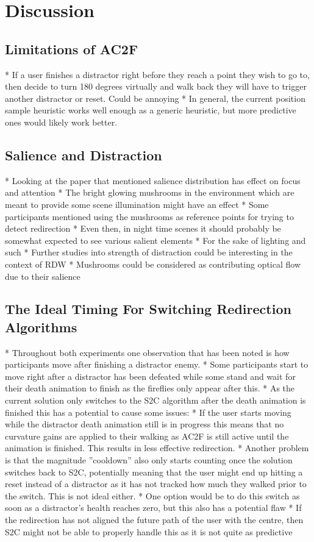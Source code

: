 \chapter{Discussion}
\label{chap:discussion}

\section{Limitations of AC2F}
* If a user finishes a distractor right before they reach a point they wish to go to, then decide to turn 180 degrees virtually and walk back they will have to trigger another distractor or reset. Could be annoying
   * In general, the current position sample heuristic works well enough as a generic heuristic, but more predictive ones would likely work better. 
   
\section{Salience and Distraction}
* Looking at the paper that mentioned salience distribution has effect on focus and attention
   * The bright glowing mushrooms in the environment which are meant to provide some scene illumination might have an effect 
   * Some participants mentioned using the mushrooms as reference points for trying to detect redirection
   * Even then, in night time scenes it should probably be somewhat expected to see various salient elements
      * For the sake of lighting and such
   * Further studies into strength of distraction could be interesting in the context of RDW
   * Mushrooms could be considered as contributing optical flow due to their salience

\section{The Ideal Timing For Switching Redirection Algorithms}
* Throughout both experiments one observation that has been noted is how participants move after finishing a distractor enemy.
* Some participants start to move right after a distractor has been defeated while some stand and wait for their death animation to finish as the fireflies only appear after this. 
* As the current solution only switches to the S2C algorithm after the death animation is finished this has a potential to cause some issues:
   * If the user starts moving while the distractor death animation still is in progress this means that no curvature gains are applied to their walking as AC2F is still active until the animation is finished. This results in less effective redirection.
   * Another problem is that the magnitude ''cooldown'' also only starts counting once the solution switches back to S2C, potentially meaning that the user might end up hitting a reset instead of a distractor as it has not tracked how much they walked prior to the switch. This is not ideal either.
* One option would be to do this switch as soon as a distractor's health reaches zero, but this also has a potential flaw
   * If the redirection has not aligned the future path of the user with the centre, then S2C might not be able to properly handle this as it is not quite as predictive

